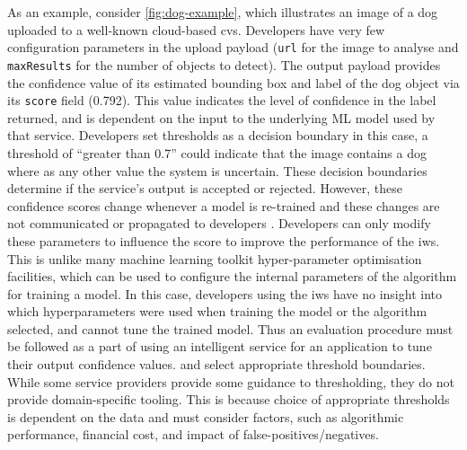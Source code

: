 As an example, consider \cref{fig:dog-example}, which illustrates an image of a dog uploaded to a well-known cloud-based \gls{cvs}. Developers have very few configuration parameters in the upload payload (\texttt{url} for the image to analyse and \texttt{maxResults} for the number of objects to detect). The  output payload provides the confidence value of its estimated bounding box and label of the dog object via its \texttt{score} field (0.792). This value indicates the level of confidence in the label returned, and is dependent on the input to the underlying ML model used by that service. Developers set thresholds as a decision boundary in this case, a threshold of ``greater than 0.7'' could indicate that the image contains a dog where as any other value the system is uncertain. These decision boundaries determine if the service's output is accepted or rejected. However, these confidence scores change whenever a model is re-trained and these changes are not communicated or propagated to developers \citep{Cummaudo:2019icsme}. Developers can only modify these parameters to influence the score to improve the performance of the \gls{iws}. This is unlike many machine learning toolkit hyper-parameter optimisation facilities, which can be used to configure the internal parameters of the algorithm for training a model. In this case, developers using the \gls{iws} have no insight into which hyperparameters were used when training the model or the algorithm selected, and cannot tune the trained model. Thus an evaluation procedure must be followed as a part of using an intelligent service for an application to tune their output confidence values. and select appropriate threshold boundaries. While some service providers provide some guidance to thresholding, they do not provide domain-specific tooling. This is because choice of appropriate thresholds is dependent on the data and must consider factors, such as algorithmic performance, financial cost, and impact of false-positives/negatives.

